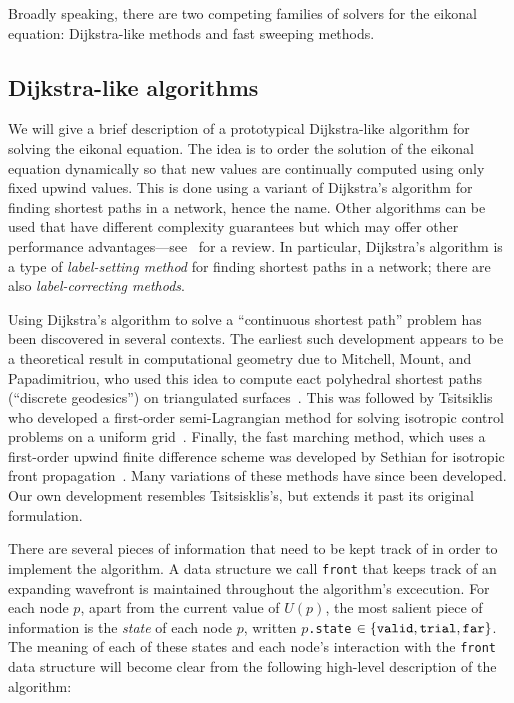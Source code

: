 \documentclass[eikonal.tex]{subfiles}
\begin{document}
Broadly speaking, there are two competing families of solvers for the
eikonal equation: Dijkstra-like methods and fast sweeping methods. 

\subsection{Dijkstra-like algorithms}\label{ssec:dijkstra-like}
We will give a brief description of a prototypical Dijkstra-like
algorithm for solving the eikonal equation. The idea is to order the
solution of the eikonal equation dynamically so that new values are
continually computed using only fixed upwind values. This is done
using a variant of Dijkstra's algorithm for finding shortest paths in
a network, hence the name. Other algorithms can be used that have
different complexity guarantees but which may offer other performance
advantages---see~\cite{chacon2012fast} for a review. In particular,
Dijkstra's algorithm is a type of \emph{label-setting method} for
finding shortest paths in a network; there are also
\emph{label-correcting methods}.

Using Dijkstra's algorithm to solve a ``continuous shortest path''
problem has been discovered in several contexts. The earliest such
development appears to be a theoretical result in computational
geometry due to Mitchell, Mount, and Papadimitriou, who used this idea
to compute eact polyhedral shortest paths (``discrete geodesics'') on
triangulated surfaces~\cite{mitchell1987discrete}. This was followed
by Tsitsiklis who developed a first-order semi-Lagrangian method for
solving isotropic control problems on a uniform
grid~\cite{tsitsiklis1995efficient}. Finally, the fast marching
method, which uses a first-order upwind finite difference scheme was
developed by Sethian for isotropic front
propagation~\cite{sethian1996fast}. Many variations of these methods
have since been developed. Our own development resembles
Tsitsisklis's, but extends it past its original formulation.

There are several pieces of information that need to be kept track of
in order to implement the algorithm. A data structure we call
\texttt{front} that keeps track of an expanding wavefront is
maintained throughout the algorithm's excecution. For each node $p$,
apart from the current value of $U(p)$, the most salient piece of
information is the \emph{state} of each node $p$, written
$p$\texttt{.state}
$\in \left\{\texttt{valid}, \texttt{trial}, \texttt{far}\right\}$. The meaning
of each of these states and each node's interaction with the
\texttt{front} data structure will become clear from the following
high-level description of the algorithm:
\end{document}
